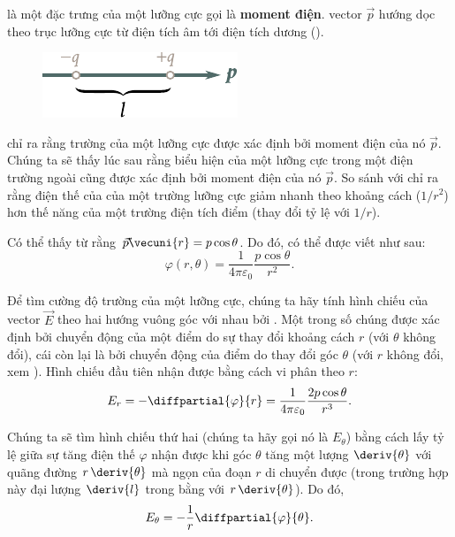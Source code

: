 \noindent
là một đặc trưng của một lưỡng cực gọi là \textbf{moment điện}. vector $\vec{p}$ hướng dọc theo trục lưỡng cực từ điện tích âm tới điện tích dương ().

\begin{figure}[!htb]
	\begin{center}
		\includegraphics[scale=1]{figures/ch_01/fig_1_10.pdf}
		\caption[]{}
		\label{fig:1_10}
	\end{center}
	\vspace{-0.85cm}
\end{figure}

 chỉ ra rằng trường của một lưỡng cực được xác định bởi moment điện của nó $\vec{p}$. Chúng ta sẽ thấy lúc sau rằng biểu hiện của một lưỡng cực trong một điện trường ngoài cũng được xác định bởi moment điện của nó $\vec{p}$. So sánh với  chỉ ra rằng điện thế của của một trường lưỡng cực giảm nhanh theo khoảng cách ($1/r^2$) hơn thế năng của một trường điện tích điểm (thay đổi tỷ lệ với $1/r$).

Có thể thấy từ  rằng $\vec{p}\!\vec{\cdot}\!\vecuni{r}=p\cos\theta$. Do đó,  có thể được viết như sau:
\begin{equation}\label{eq:1_50}
	\varphi(r,\theta) = \frac{1}{4\pi\varepsilon_0} \frac{p\cos\theta}{r^2}.
\end{equation}

Để tìm cường độ trường của một lưỡng cực, chúng ta hãy tính hình chiếu của vector $\vec{E}$ theo hai hướng vuông góc với nhau bởi . Một trong số chúng được xác định bởi chuyển động của một điểm do sự thay đổi khoảng cách $r$ (với $\theta$ không đổi), cái còn lại là bởi chuyển động của điểm do thay đổi góc $\theta$ (với $r$ không đổi, xem ). Hình chiếu đầu tiên nhận được bằng cách vi phân  theo $r$:
\begin{equation}\label{eq:1_51}
	E_r = - \diffpartial{\varphi}{r} = \frac{1}{4\pi\varepsilon_0} \frac{2p\cos\theta}{r^3}.
\end{equation}

\noindent
Chúng ta sẽ tìm hình chiếu thứ hai (chúng ta hãy gọi nó là  $E_{\theta}$) bằng cách lấy tỷ lệ giữa sự tăng điện thế $\varphi$ nhận được khi góc $\theta$ tăng một lượng $\deriv{\theta}$ với quãng đường $r\,\deriv{\theta}$ mà ngọn của đoạn $r$ di chuyển được (trong trường hợp này đại lượng $\deriv{l}$ trong  bằng với $r\,\deriv{\theta}$). Do đó,
\begin{equation*}
	E_{\theta} = - \frac{1}{r}\diffpartial{\varphi}{\theta}.
\end{equation*}


